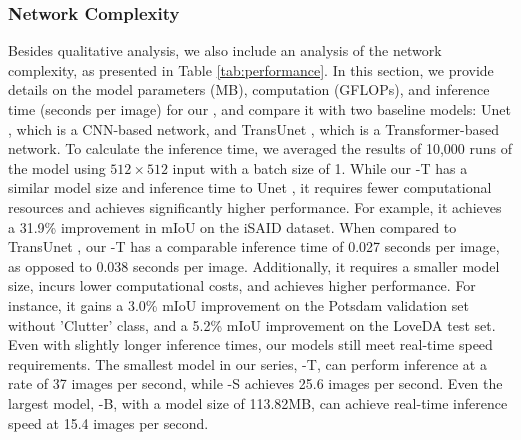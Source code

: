 \documentclass[journal]{IEEEtran}
\begin{document}
\subsubsection{\textbf{Network Complexity}}
Besides qualitative analysis, we also include an analysis of the network complexity, as presented in Table \ref{tab:performance}. In this section, we provide details on the model parameters (MB), computation (GFLOPs), and inference time (seconds per image) for our \model, and compare it with two baseline models: Unet \cite{ronneberger2015u}, which is a CNN-based network, and TransUnet \cite{chen2021transunet}, which is a Transformer-based network. To calculate the inference time, we averaged the results of 10,000 runs of the model using $512\times 512$ input with a batch size of 1. While our \model-T has a similar model size and inference time to Unet \cite{ronneberger2015u}, it requires fewer computational resources and achieves significantly higher performance. For example, it achieves a 31.9\% improvement in mIoU on the iSAID dataset. When compared to TransUnet \cite{chen2021transunet}, our \model-T has a comparable inference time of 0.027 seconds per image, as opposed to 0.038 seconds per image. Additionally, it requires a smaller model size, incurs lower computational costs, and achieves higher performance. For instance, it gains a 3.0\% mIoU improvement on the Potsdam validation set without 'Clutter' class, and a 5.2\% mIoU improvement on the LoveDA test set. Even with slightly longer inference times, our models still meet real-time speed requirements. The smallest model in our series, \model-T, can perform inference at a rate of 37 images per second, while \model-S achieves 25.6 images per second. Even the largest model, \model-B, with a model size of 113.82MB, can achieve real-time inference speed at 15.4 images per second.


\begin{table}[h]
\centering
\caption{Performance comparison of our models with different sizes of the backbone.}
\renewcommand{\arraystretch}{1.2}

\label{tab:performance}
\end{table}
\end{document}
